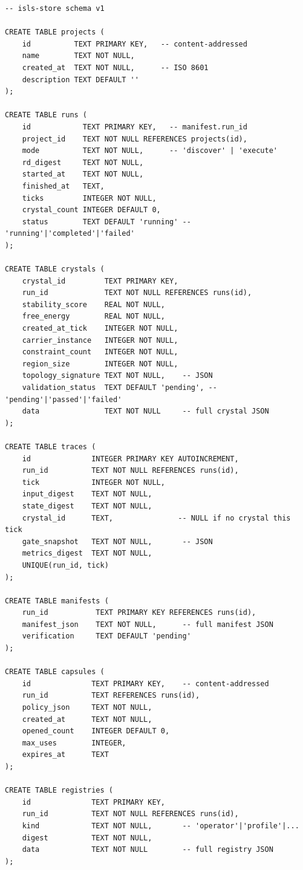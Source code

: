 \documentclass[11pt,a4paper,twoside]{article}
\theoremstyle{definition}
\theoremstyle{plain}
\theoremstyle{remark}
\begin{document}
\begin{verbatim}
-- isls-store schema v1

CREATE TABLE projects (
    id          TEXT PRIMARY KEY,   -- content-addressed
    name        TEXT NOT NULL,
    created_at  TEXT NOT NULL,      -- ISO 8601
    description TEXT DEFAULT ''
);

CREATE TABLE runs (
    id            TEXT PRIMARY KEY,   -- manifest.run_id
    project_id    TEXT NOT NULL REFERENCES projects(id),
    mode          TEXT NOT NULL,      -- 'discover' | 'execute'
    rd_digest     TEXT NOT NULL,
    started_at    TEXT NOT NULL,
    finished_at   TEXT,
    ticks         INTEGER NOT NULL,
    crystal_count INTEGER DEFAULT 0,
    status        TEXT DEFAULT 'running' -- 'running'|'completed'|'failed'
);

CREATE TABLE crystals (
    crystal_id         TEXT PRIMARY KEY,
    run_id             TEXT NOT NULL REFERENCES runs(id),
    stability_score    REAL NOT NULL,
    free_energy        REAL NOT NULL,
    created_at_tick    INTEGER NOT NULL,
    carrier_instance   INTEGER NOT NULL,
    constraint_count   INTEGER NOT NULL,
    region_size        INTEGER NOT NULL,
    topology_signature TEXT NOT NULL,    -- JSON
    validation_status  TEXT DEFAULT 'pending', -- 'pending'|'passed'|'failed'
    data               TEXT NOT NULL     -- full crystal JSON
);

CREATE TABLE traces (
    id              INTEGER PRIMARY KEY AUTOINCREMENT,
    run_id          TEXT NOT NULL REFERENCES runs(id),
    tick            INTEGER NOT NULL,
    input_digest    TEXT NOT NULL,
    state_digest    TEXT NOT NULL,
    crystal_id      TEXT,               -- NULL if no crystal this tick
    gate_snapshot   TEXT NOT NULL,       -- JSON
    metrics_digest  TEXT NOT NULL,
    UNIQUE(run_id, tick)
);

CREATE TABLE manifests (
    run_id           TEXT PRIMARY KEY REFERENCES runs(id),
    manifest_json    TEXT NOT NULL,      -- full manifest JSON
    verification     TEXT DEFAULT 'pending'
);

CREATE TABLE capsules (
    id              TEXT PRIMARY KEY,    -- content-addressed
    run_id          TEXT REFERENCES runs(id),
    policy_json     TEXT NOT NULL,
    created_at      TEXT NOT NULL,
    opened_count    INTEGER DEFAULT 0,
    max_uses        INTEGER,
    expires_at      TEXT
);

CREATE TABLE registries (
    id              TEXT PRIMARY KEY,
    run_id          TEXT NOT NULL REFERENCES runs(id),
    kind            TEXT NOT NULL,       -- 'operator'|'profile'|...
    digest          TEXT NOT NULL,
    data            TEXT NOT NULL        -- full registry JSON
);


\end{verbatim}
\end{document}
